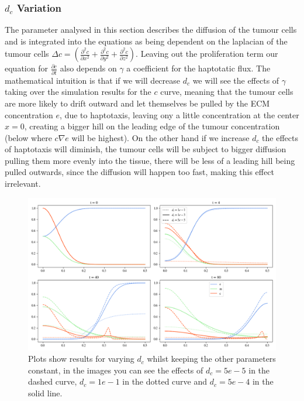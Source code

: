 \subsubsection*{$d_c$ Variation}
The parameter analysed in this section describes the diffusion of the tumour cells and is integrated into the equations as being dependent on the laplacian of the tumour cells $\Delta c = (\frac{\partial^2 c}{\partial x^2} + \frac{\partial^2 c}{\partial y^2} + \frac{\partial^2 c}{\partial z^2})$. Leaving out the proliferation term our equation for $\frac{\partial c}{\partial t}$ also depends on $\gamma$ a coefficient for the haptotatic flux. The mathematical intuition is that if we will decrease $d_c$ we will see the effects of $\gamma$ taking over the simulation results for the $c$ curve, meaning that the tumour cells are more likely to drift outward and let themselves be pulled by the ECM concentration $e$, due to haptotaxis, leaving ony a little concentration at the center $x=0$, creating a bigger hill on the leading edge of the tumour concentration (below where $c \nabla e$ will be highest). On the other hand if we increase $d_c$ the effects of haptotaxis will diminish, the tumour cells will be subject to bigger diffusion pulling them more evenly into the tissue, there will be less of a leading hill being pulled outwards, since the diffusion will happen too fast, making this effect irrelevant. 
\begin{figure}[h]
    \centering
    \includegraphics[width=\textwidth]{resources/images/dc_variation.png}
    \caption{Plots show results for varying $d_c$ whilst keeping the other parameters constant, in the images you can see the effects of $d_c=5e-5$ in the dashed curve, $d_c=1e-1$ in the dotted curve and $d_c=5e-4$ in the solid line.}
    \label{fig:dc_comparison}
\end{figure}
